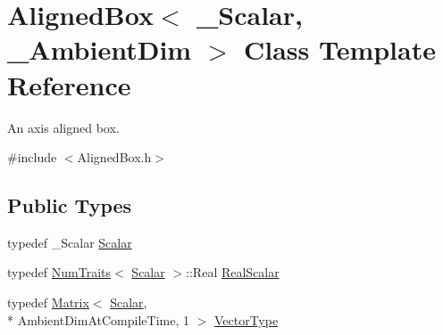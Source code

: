 \hypertarget{class_aligned_box}{\section{Aligned\-Box$<$ \-\_\-\-Scalar, \-\_\-\-Ambient\-Dim $>$ Class Template Reference}
\label{class_aligned_box}
}


An axis aligned box.  




{\ttfamily \#include $<$Aligned\-Box.\-h$>$}

\subsection*{Public Types}
\begin{DoxyCompactItemize}
\item 
typedef \-\_\-\-Scalar \hyperlink{class_aligned_box_a9657f66d123142ede4a4c9c12768b187}{Scalar}
\item 
typedef \hyperlink{struct_num_traits}{Num\-Traits}$<$ \hyperlink{class_aligned_box_a9657f66d123142ede4a4c9c12768b187}{Scalar} $>$\-::Real \hyperlink{class_aligned_box_ab5698d35c955ad9f8e8bd5a809338439}{Real\-Scalar}
\item 
typedef \hyperlink{class_matrix}{Matrix}$<$ \hyperlink{class_aligned_box_a9657f66d123142ede4a4c9c12768b187}{Scalar}, \\*
Ambient\-Dim\-At\-Compile\-Time, 1 $>$ \hyperlink{class_aligned_box_a0c3d2a6c755e0ad65a6e45371a4079ef}{Vector\-Type}
\end{DoxyCompactItemize}
